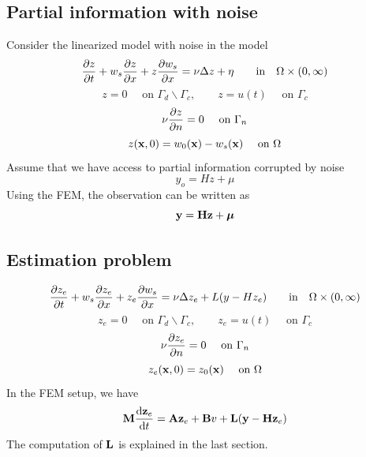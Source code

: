\documentclass[12pt]{article}
\begin{document}
\subsection{Partial information with noise}
Consider the linearized model with noise in the model
\begin{equation*}
\frac{\partial z}{\partial t} + w_s \frac{\partial z}{\partial x} + z \frac{\partial w_s}{\partial x} = \nu \Delta z + \eta \qquad \mbox{in} \quad \Omega \times (0,\infty)
\end{equation*}
\begin{equation*}
z = 0 \quad \text{ on } \Gamma_d \backslash \Gamma_c, \qquad z = u(t) \quad \text{ on } \Gamma_c
\end{equation*}
\begin{equation*}
\nu \frac{\partial z}{\partial n} = 0 \quad \text{ on } \Gamma_n
\end{equation*}
\begin{equation*}
z({\mathbf x},0) = w_0({\mathbf x}) - w_s({\mathbf x}) \quad \text{ on } \Omega
\end{equation*}
Assume that we have access to partial information corrupted by noise
\[
y_o = Hz + \mu
\]
Using the FEM, the observation can be written as
\[
{\mathbf y} = {\mathbf H} {\mathbf z} + \boldsymbol\mu
\]


\subsection{Estimation problem}
\begin{equation*}
\frac{\partial z_e}{\partial t} + w_s \frac{\partial z_e}{\partial x} + z_e \frac{\partial w_s}{\partial x} = \nu \Delta z_e +  L( y - H z_e ) \qquad \mbox{in} \quad \Omega \times (0,\infty)
\end{equation*}
\begin{equation*}
z_e = 0 \quad \text{ on } \Gamma_d \backslash \Gamma_c, \qquad z_e = u(t) \quad \text{ on } \Gamma_c
\end{equation*}
\begin{equation*}
\nu \frac{\partial z_e}{\partial n} = 0 \quad \text{ on } \Gamma_n
\end{equation*}
\begin{equation*}
z_e({\mathbf x},0) = z_0({\mathbf x}) \quad \text{ on } \Omega
\end{equation*} 
In the FEM setup, we have
\[
{\mathbf M} \frac{\textrm{d} {\mathbf z}_e}{\textrm{d} t} = {\mathbf A} {\mathbf z}_e + {\mathbf B} v + {\mathbf L}({\mathbf y} - {\mathbf H} {\mathbf z}_e)
\]
The computation of ${\mathbf L}$ is explained in the last section.
\end{document}
